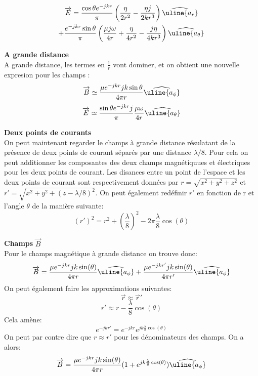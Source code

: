 \documentclass[10pt,a4paper]{article}
\newcommand{\V}[1]{\overrightarrow{#1}}
\newcommand{\Base}[1]{\widehat{\uline{a_{#1}}}} %
\begin{document}
\begin{multline}
\V{E} = \frac{\cos \theta e^{-jkr}}{\pi} \left( \frac{\eta}{2r^2}  - \frac{\eta j}{2kr^3}  \right) \Base{r} \\ 
+ \frac{e^{-jkr}\sin \theta}{\pi} \left( \frac{\mu j \omega}{4r} + \frac{\eta}{4 r^2} - \frac{j \eta }{4 k r^3} \right) \Base{\theta}
\end{multline}


\indent \textbf{A grande distance}\\
A grande distance, les termes en $\frac{1}{r}$ vont dominer, et on obtient une nouvelle expresion pour les champs :
\begin{equation}
\V{B} \simeq \frac{\mu e^{-jkr} jk \sin \theta}{4 \pi r} \Base{\phi}
\end{equation}
\begin{equation}
\V{E} \simeq \frac{\sin \theta e^{-jkr}j}{\pi}  \frac{\mu \omega}{4 r}  \Base{\theta}
\end{equation}


\indent \textbf{Deux points de courants}\\
On peut maintenant regarder le champs à grande distance résulatant de la présence de deux points de courant séparés par une distance $\lambda /8$. Pour cela on peut additionner les composantes des deux champs magnétiquues et électriques pour les deux points de courant. Les disances entre un point de l'espace et les deux points de courant sont respectivement données par $r=\sqrt{x^2+y^2+z^2}$ et $r'=\sqrt{x^2+y^2+(z-\lambda /8)^2}$. On peut également redéfinir $r'$ en fonction de r et l'angle $\theta$ de la manière suivante:
$$ (r')^2=r^2+\left( \dfrac{\lambda}{8}\right)^2-2\pi \dfrac{\lambda}{8}\cos (\theta )$$

\textbf{Champs} $\overrightarrow{B}$\\
Pour le champs magnétique à grande distance on trouve donc:
\begin{equation}
\overrightarrow{B}= \frac{\mu e^{-jkr} jk \sin (\theta )}{4 \pi r} \Base{\phi} + \frac{\mu e^{-jkr'} jk \sin (\theta )}{4 \pi r'} \Base{\phi}
\end{equation}
On peut également faire les approximations suivantes:
$$\V{r}\approx \V{r}'$$
$$r'\approx r-\frac{\lambda}{8}\cos (\theta)$$
Cela amène:
$$e^{-jkr'}=e^{-jkr}e^{jk\frac{\lambda}{8}\cos (\theta)}$$
On peut par contre dire que $r\approx r'$ pour les dénominateurs des champs. On a alors:
\begin{equation}
\overrightarrow{B}= \dfrac{\mu e^{-jkr} jk \sin (\theta )}{4 \pi r}(1+e^{jk\frac{\lambda}{8}\cos (\theta)}) \Base{\phi}
\end{equation}
\end{document}
